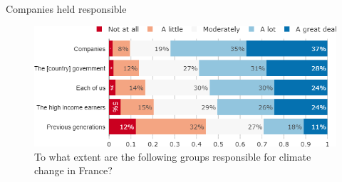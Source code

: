 \begin{framefont}{\small}

\begin{frame}{Companies held responsible}%
\begin{figure}[h!]
\centering
\caption{To what extent are the following groups responsible for climate change in France?}
\includegraphics[width=.7\paperwidth]{../figures/FR/CC_responsible_FR.png}
\end{figure}
\end{frame}



\end{framefont}

